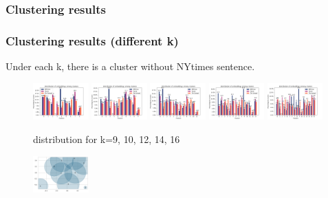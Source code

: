 \documentclass{tum-presentation}
\begin{document}
  \subsubsection{Clustering results}
  \begin{frame}[fragile]
    \frametitle{Clustering results (different k)}
    
      Under each k, there is a cluster without NYtimes sentence.
      
      \begin{center}
        \begin{figure}[t]
          \includegraphics[width=0.19\textwidth]{figures/kmean-output_9ks-grouped-bar.png}
          \includegraphics[width=0.19\textwidth]{figures/kmean-output_10ks-grouped-bar.png}
          \includegraphics[width=0.19\textwidth]{figures/kmean-output_12ks-grouped-bar.png}
          \includegraphics[width=0.19\textwidth]{figures/kmean-output_14ks-grouped-bar.png}
          \includegraphics[width=0.19\textwidth]{figures/kmean-output_16ks-grouped-bar.png}
          \caption{distribution for k=9, 10, 12, 14, 16}
        \end{figure}
      \end{center}
    \begin{center}
      \begin{figure}[t]
        \includegraphics[width=0.19\textwidth]{figures/k09.png}

\end{figure}
\end{center}
\end{frame}
\end{document}
